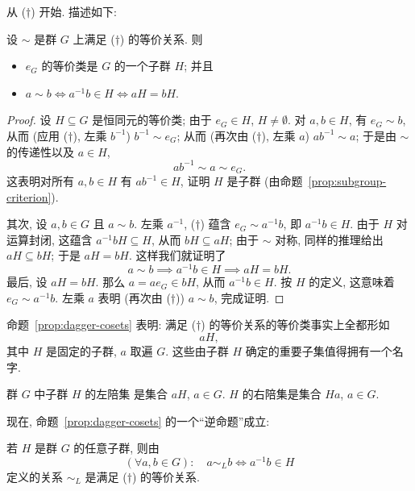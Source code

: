 从 ($\dagger$) 开始. 描述如下:

\begin{proposition}
\label{prop:dagger-cosets}
设 $\sim$ 是群 $G$ 上满足 ($\dagger$) 的等价关系. 则
\begin{itemize}
	\item $e_G$ 的等价类是 $G$ 的一个子群 $H$; 并且
	\item $a \sim b \iff a^{-1}b \in H \iff aH = bH$.
\end{itemize}
\end{proposition}

\begin{proof}
设 $H \subseteq G$ 是恒同元的等价类; 由于 $e_G \in H$, $H \neq \emptyset$. 对 $a, b \in H$, 有 $e_G \sim b$, 从而 (应用 ($\dagger$), 左乘 $b^{-1}$) $b^{-1} \sim e_G$; 从而 (再次由 ($\dagger$), 左乘 $a$) $ab^{-1} \sim a$; 于是由 $\sim$ 的传递性以及 $a \in H$,
\[
ab^{-1} \sim a \sim e_G.
\]
这表明对所有 $a, b \in H$ 有 $ab^{-1} \in H$, 证明 $H$ 是子群 (由命题~\ref{prop:subgroup-criterion}).

其次, 设 $a, b \in G$ 且 $a \sim b$. 左乘 $a^{-1}$, ($\dagger$) 蕴含 $e_G \sim a^{-1}b$, 即 $a^{-1}b \in H$. 由于 $H$ 对运算封闭, 这蕴含 $a^{-1}bH \subseteq H$, 从而 $bH \subseteq aH$; 由于 $\sim$ 对称, 同样的推理给出 $aH \subseteq bH$; 于是 $aH = bH$. 这样我们就证明了
\[
a \sim b \implies a^{-1}b \in H \implies aH = bH.
\]
最后, 设 $aH = bH$. 那么 $a = ae_G \in bH$, 从而 $a^{-1}b \in H$. 按 $H$ 的定义, 这意味着 $e_G \sim a^{-1}b$. 左乘 $a$ 表明 (再次由 ($\dagger$)) $a \sim b$, 完成证明.
\end{proof}

命题~\ref{prop:dagger-cosets} 表明: 满足 ($\dagger$) 的等价关系的等价类事实上全都形如
\[
aH,
\]
其中 $H$ 是固定的子群, $a$ 取遍 $G$. 这些由子群 $H$ 确定的重要子集值得拥有一个名字.

\begin{definition}
\label{def:cosets}
群 $G$ 中子群 $H$ 的左陪集%
是集合 $aH$, $a \in G$. $H$ 的右陪集是集合 $Ha$, $a \in G$.
\end{definition}

现在, 命题~\ref{prop:dagger-cosets} 的一个``逆命题''成立:

\begin{proposition}
\label{prop:coset-relation}
若 $H$ 是群 $G$ 的任意子群, 则由
\[
(\forall a, b \in G): \quad a \sim_L b \iff a^{-1}b \in H
\]
定义的关系 $\sim_L$ 是满足 ($\dagger$) 的等价关系.
\end{proposition}

